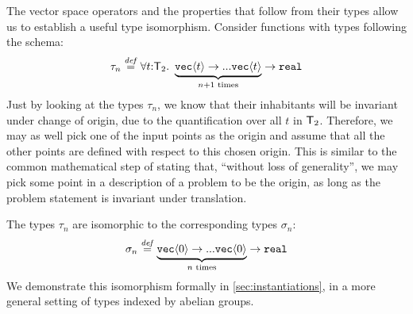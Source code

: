 \begin{example}\label{ex:type-iso}
  The vector space operators and the properties that follow from their
  types allow us to establish a useful type isomorphism. Consider
  functions with types following the schema:
  \begin{displaymath}
    \tau_{n} \stackrel{\mathit{def}}= \forall t\mathord:\mathsf{T}_2.\ \underbrace{\texttt{vec}\langle t \rangle \to ... \texttt{vec}\langle t \rangle}_{n+1\textrm{ times}} \to \texttt{real}
  \end{displaymath}
  Just by looking at the types $\tau_{n}$, we know that their
  inhabitants will be invariant under change of origin, due to the
  quantification over all $t$ in $\mathsf{T}_2$. Therefore, we may as well pick
  one of the input points as the origin and assume that all the other
  points are defined with respect to this chosen origin. This is
  similar to the common mathematical step of stating that, ``without
  loss of generality'', we may pick some point in a description of a
  problem to be the origin, as long as the problem statement is
  invariant under translation.

  The types $\tau_{n}$ are isomorphic to the corresponding types
  $\sigma_{n}$:
  \begin{displaymath}
    \sigma_{n} \stackrel{\mathit{def}}= \underbrace{\texttt{vec}\langle 0 \rangle \to ... \texttt{vec}\langle 0 \rangle}_{n\textrm{ times}} \to \texttt{real}
  \end{displaymath}
  We demonstrate this isomorphism formally in
  \autoref{sec:instantiations}, in a more general setting of types
  indexed by abelian groups.

\end{example}

